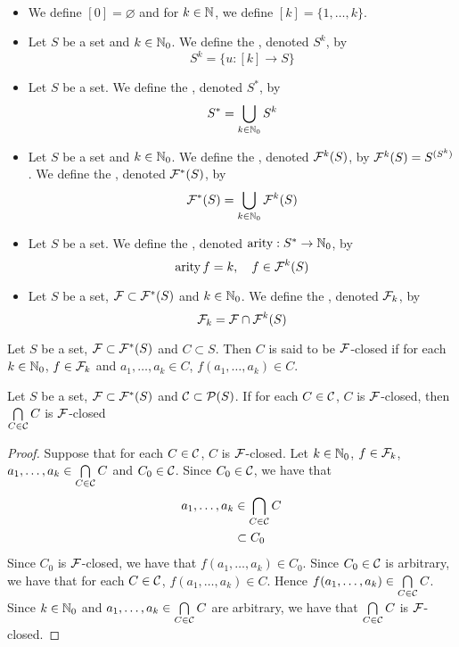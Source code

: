 \documentclass{book}
\begin{document}
	\begin{defn}\
	\begin{itemize}
		\item We define $[0] = \varnothing$ and for $k \in \mathbb{N}$, we define $[k] = \{1, \ldots, k\}$. 
		\item Let $S$ be a set and $k \in \mathbb{N}_0$. We define the , denoted $S^k$, by 
		$$S^k = \{u: [k] \rightarrow S\}$$
		\item Let $S$ be a set. We define the , denoted $S^*$, by 
		$$S^* = \bigcup_{k \in \mathbb{N}_0} S^k$$
		\item Let $S$ be a set and $k \in \mathbb{N}_0$. We define the , denoted $\mathcal{F}^k(S)$, by $\mathcal{F}^k(S) = S^{(S^k)}$. We define the , denoted $\mathcal{F}^*(S)$, by
		$$\mathcal{F}^*(S) = \bigcup_{k \in \mathbb{N}_0} \mathcal{F}^k(S)$$
		\item Let $S$ be a set. We define the , denoted $\operatorname*{\text{\text{arity}}}: S^* \rightarrow \mathbb{N}_0$, by 
		$$\operatorname*{\text{\text{arity}}} f = k, \quad f \in \mathcal{F}^k(S)$$
		\item Let $S$ be a set, $\mathcal{F} \subset \mathcal{F}^*(S)$ and $k \in \mathbb{N}_0$. We define the , denoted $\mathcal{F}_k$, by 
		$$\mathcal{F}_k = \mathcal{F} \cap \mathcal{F}^k(S)$$
	\end{itemize}
	\end{defn}

	\begin{defn}
		Let $S$ be a set, $\mathcal{F} \subset \mathcal{F}^*(S)$ and $C \subset S$. Then $C$ is said to be  $\mathcal{F}$-closed if for each $k \in \mathbb{N}_0$, $f \in \mathcal{F}_k$ and $a_1, \ldots, a_k \in C$, $f(a_1, \ldots, a_k) \in C$.
	\end{defn}

	\begin{defn}
		Let $S$ be a set, $\mathcal{F} \subset \mathcal{F}^*(S)$ and $\mathcal{C} \subset \mathcal{P}(S)$. If for each $C \in \mathcal{C}$, $C$ is  $\mathcal{F}$-closed, then $\bigcap\limits_{C \in \mathcal{C}} C$ is $\mathcal{F}$-closed
	\end{defn}

	\begin{proof}
		Suppose that for each $C \in \mathcal{C}$, $C$ is  $\mathcal{F}$-closed. Let $k \in \mathbb{N}_0$, $f \in \mathcal{F}_k$, $a_1, \ldots, a_k \in \bigcap\limits_{C \in \mathcal{C}} C$ and $C_0 \in \mathcal{C}$. Since $C_0 \in \mathcal{C}$, we have that 
		\begin{align*}
			a_1, \ldots, a_k 
			& \in \bigcap_{C \in \mathcal{C}} C \\
			& \subset C_0
		\end{align*}
		Since $C_0$ is $\mathcal{F}$-closed, we have that $f(a_1, \ldots, a_k) \in C_0$. Since $C_0 \in \mathcal{C}$ is arbitrary, we have that for each $C \in \mathcal{C}$, $f(a_1, \ldots, a_k) \in C$. Hence $f(a_1, \ldots, a_k) \in \bigcap\limits_{C \in \mathcal{C}} C$. Since $k \in \mathbb{N}_0$ and $a_1, \ldots, a_k \in \bigcap\limits_{C \in \mathcal{C}} C$ are arbitrary, we have that $\bigcap\limits_{C \in \mathcal{C}} C$ is $\mathcal{F}$-closed.
	\end{proof}
\end{document}
